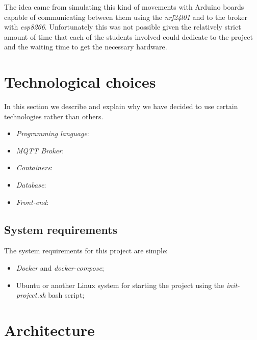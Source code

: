\documentclass[conference]{IEEEtran}
\begin{document}
	The idea came from simulating this kind of movements with Arduino boards capable of communicating between them using the \textit{nrf24l01} and to the broker with \textit{esp8266}.
	Unfortunately this was not possible given the relatively strict amount of time that each of the students involved could dedicate to the project and the waiting time to get the necessary hardware.

\section{Technological choices}\label{sec:technological_choices}

	In this section we describe and explain why we have decided to use certain technologies rather than others.
	
	\begin{itemize}
		\item \textit{Programming language}:
		\item \textit{MQTT Broker}:
		\item \textit{Containers}:
		\item \textit{Database}:
		\item \textit{Front-end}:
	\end{itemize}

	\subsection{System requirements}
	
		The system requirements for this project are simple:
		\begin{itemize}
			\item \textit{Docker} and \textit{docker-compose};
			\item Ubuntu or another Linux system for starting the project using the \textit{init-project.sh} bash script;
		\end{itemize}

\section{Architecture}\label{sec:architecture}
\end{document}
